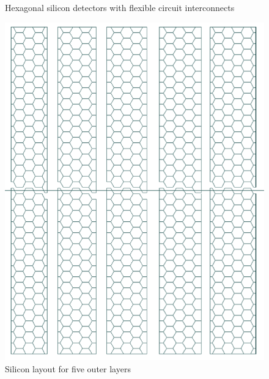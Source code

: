 \begin{figure}
\begin{minipage}[b]{.29\textwidth}
		\caption{Hexagonal silicon detectors with flexible circuit interconnects}
		\label{fig:Calorimeter:SiDECAL:hexagon}
	\end{minipage}\hfill
	\begin{minipage}[b]{.65\textwidth}
		\includegraphics[width=\linewidth]{Calorimeter/SiliconTungstenSiD/siliconLayout}
		\caption{Silicon layout for five outer layers}
		\label{fig:Calorimeter:SiDECAL:siliconLayout}
	\end{minipage}
\end{figure}
